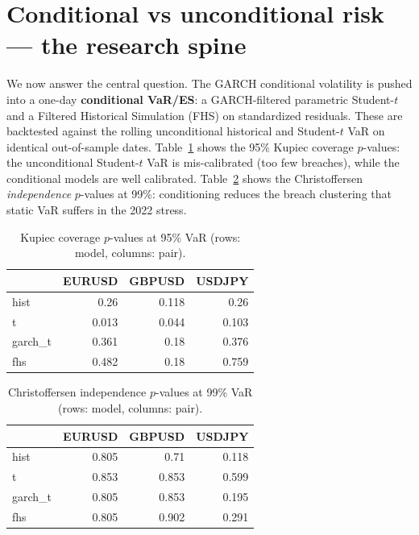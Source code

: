 \documentclass[11pt,a4paper]{article}
\begin{document}
\section{Conditional vs unconditional risk --- the research spine}
We now answer the central question. The GARCH conditional volatility is pushed into a one-day
\textbf{conditional VaR/ES}: a GARCH-filtered parametric Student-$t$ and a Filtered Historical Simulation
(FHS) on standardized residuals. These are backtested against the rolling unconditional historical and
Student-$t$ VaR on identical out-of-sample dates. Table~\ref{tab:kup95} shows the 95\% Kupiec coverage
$p$-values: the unconditional Student-$t$ VaR is mis-calibrated (too few breaches), while the conditional
models are well calibrated. Table~\ref{tab:ind99} shows the Christoffersen \emph{independence} $p$-values
at 99\%: conditioning reduces the breach clustering that static VaR suffers in the 2022 stress.
\begin{table}[H]\centering
\small
\caption{Kupiec coverage $p$-values at 95\% VaR (rows: model, columns: pair).}\label{tab:kup95}
\begin{tabular}{lrrr}
\toprule
 & EURUSD & GBPUSD & USDJPY \\
\midrule
hist & 0.26 & 0.118 & 0.26 \\
t & 0.013 & 0.044 & 0.103 \\
garch\_t & 0.361 & 0.18 & 0.376 \\
fhs & 0.482 & 0.18 & 0.759 \\
\bottomrule
\end{tabular}
\end{table}
\begin{table}[H]\centering
\small
\caption{Christoffersen independence $p$-values at 99\% VaR (rows: model, columns: pair).}\label{tab:ind99}
\begin{tabular}{lrrr}
\toprule
 & EURUSD & GBPUSD & USDJPY \\
\midrule
hist & 0.805 & 0.71 & 0.118 \\
t & 0.853 & 0.853 & 0.599 \\
garch\_t & 0.805 & 0.853 & 0.195 \\
fhs & 0.805 & 0.902 & 0.291 \\
\bottomrule
\end{tabular}
\end{table}
\end{document}
